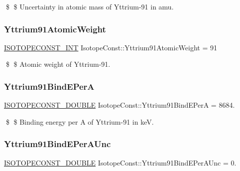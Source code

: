 \$ \$ Uncertainty in atomic mass of Yttrium-\/91 in amu. \mbox{\label{group___isotope_const-_yttrium-_y91_ga362c3454bea2445211ac50bd4309264a}} 
\subsubsection{\texorpdfstring{Yttrium91\+Atomic\+Weight}{Yttrium91AtomicWeight}}
{\footnotesize\ttfamily \mbox{\hyperlink{group___isotope_const-_macros_ga5f18360b3e99483a35c32d789e62621c}{I\+S\+O\+T\+O\+P\+E\+C\+O\+N\+S\+T\+\_\+\+I\+NT}} Isotope\+Const\+::\+Yttrium91\+Atomic\+Weight = 91}

\$ \$ Atomic weight of Yttrium-\/91. \mbox{\label{group___isotope_const-_yttrium-_y91_ga1b4b5f4d983c933faec9dfbc7515972e}} 
\subsubsection{\texorpdfstring{Yttrium91\+Bind\+E\+PerA}{Yttrium91BindEPerA}}
{\footnotesize\ttfamily \mbox{\hyperlink{group___isotope_const-_macros_ga8f45a7272ce02c0b4c65c44636ed719a}{I\+S\+O\+T\+O\+P\+E\+C\+O\+N\+S\+T\+\_\+\+D\+O\+U\+B\+LE}} Isotope\+Const\+::\+Yttrium91\+Bind\+E\+PerA = 8684.}

\$ \$ Binding energy per A of Yttrium-\/91 in keV. \mbox{\label{group___isotope_const-_yttrium-_y91_ga4e390befb3833e8fa3ed3a1b447fadda}} 
\subsubsection{\texorpdfstring{Yttrium91\+Bind\+E\+Per\+A\+Unc}{Yttrium91BindEPerAUnc}}
{\footnotesize\ttfamily \mbox{\hyperlink{group___isotope_const-_macros_ga8f45a7272ce02c0b4c65c44636ed719a}{I\+S\+O\+T\+O\+P\+E\+C\+O\+N\+S\+T\+\_\+\+D\+O\+U\+B\+LE}} Isotope\+Const\+::\+Yttrium91\+Bind\+E\+Per\+A\+Unc = 0.}

